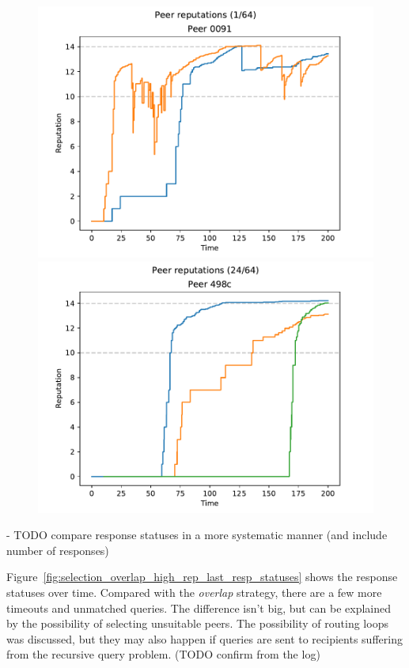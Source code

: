 \begin{figure}[t]
\centering
\includegraphics[width=0.5\columnwidth]{figures/selection_overlap_high_rep_last_peer_reps_1_of_64}%
\includegraphics[width=0.5\columnwidth]{figures/selection_overlap_high_rep_last_peer_reps_24_of_64}
\label{fig:selection_overlap_high_rep_last_peer_reps}
\end{figure}

- TODO compare response statuses in a more systematic manner (and include number
  of responses)

Figure~\ref{fig:selection_overlap_high_rep_last_resp_statuses} shows the
response statuses over time. Compared with the \emph{overlap} strategy, there
are a few more timeouts and unmatched queries. The difference isn't big, but can
be explained by the possibility of selecting unsuitable peers. The possibility
of routing loops was discussed, but they may also happen if queries are sent to
recipients suffering from the recursive query problem. (TODO confirm from the
log)

